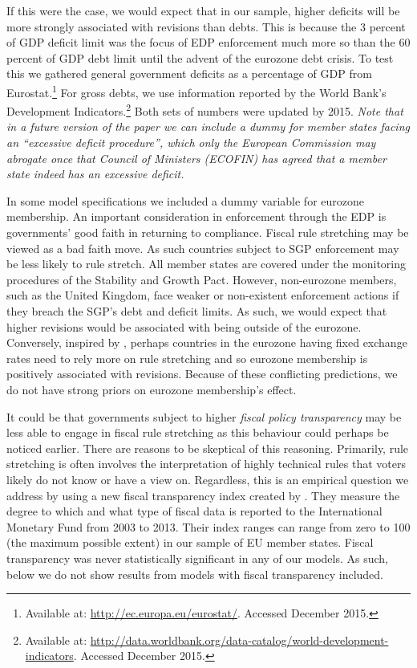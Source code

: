 \documentclass[]{article}
\begin{document}

If this were the case, we would expect that in our sample, higher deficits will be more strongly associated with revisions than debts. This is because the 3 percent of GDP deficit limit was the focus of EDP enforcement much more so than the 60 percent of GDP debt limit until the advent of the eurozone debt crisis. To test this we gathered general government deficits as a percentage of GDP from Eurostat.\footnote{Available at: \url{http://ec.europa.eu/eurostat/}. Accessed December 2015.} For gross debts, we use information reported by the World Bank's Development Indicators.\footnote{Available at: \url{http://data.worldbank.org/data-catalog/world-development-indicators}. Accessed December 2015.} Both sets of numbers were updated by 2015. \emph{Note that in a future version of the paper we can include a dummy for member states facing an ``excessive deficit procedure'', which only the European Commission may abrogate once that Council of Ministers (ECOFIN) has agreed that a member state indeed has an excessive deficit.}

In some model specifications we included a dummy variable for eurozone membership. An important consideration in enforcement through the EDP is governments' good faith in returning to compliance. Fiscal rule stretching may be viewed as a bad faith move. As such countries subject to SGP enforcement may be less likely to rule stretch. All member states are covered under the monitoring procedures of the Stability and Growth Pact. However, non-eurozone members, such as the United Kingdom, face weaker or non-existent enforcement actions if they breach the SGP's debt and deficit limits. As such, we would expect that higher revisions would be associated with being outside of the eurozone. Conversely, inspired by \cite{clark2003}, perhaps countries in the eurozone having fixed exchange rates need to rely more on rule stretching and so eurozone membership is positively associated with revisions. Because of these conflicting predictions, we do not have strong priors on eurozone membership's effect.

It could be that governments subject to higher \emph{fiscal policy transparency} may be less able to engage in fiscal rule stretching as this behaviour could perhaps be noticed earlier. There are reasons to be skeptical of this reasoning. Primarily, rule stretching is often involves the interpretation of highly technical rules that voters likely do not know or have a view on. Regardless, this is an empirical question we address by using a new fiscal transparency index created by \cite{Wang2015}. They measure the degree to which and what type of fiscal data is reported to the International Monetary Fund from 2003 to 2013. Their index ranges can range from zero to 100 (the maximum possible extent) in our sample of EU member states. Fiscal transparency was never statistically significant in any of our models. As such, below we do not show results from models with fiscal transparency included.
\end{document}

